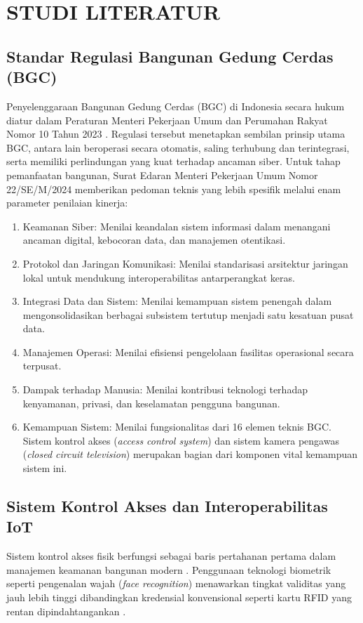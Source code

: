 \cleardoublepage
\chapter{STUDI LITERATUR}
\label{chap:studi-literatur}

\section{Standar Regulasi Bangunan Gedung Cerdas (BGC)}
Penyelenggaraan Bangunan Gedung Cerdas (BGC) di Indonesia secara hukum diatur dalam Peraturan Menteri Pekerjaan Umum dan Perumahan Rakyat Nomor 10 Tahun 2023 \autocite{PermenPUPR_10_2023}. Regulasi tersebut menetapkan sembilan prinsip utama BGC, antara lain beroperasi secara otomatis, saling terhubung dan terintegrasi, serta memiliki perlindungan yang kuat terhadap ancaman siber. Untuk tahap pemanfaatan bangunan, Surat Edaran Menteri Pekerjaan Umum Nomor 22/SE/M/2024 \autocite{pu2024se22} memberikan pedoman teknis yang lebih spesifik melalui enam parameter penilaian kinerja:

\begin{enumerate}
    \item Keamanan Siber: Menilai keandalan sistem informasi dalam menangani ancaman digital, kebocoran data, dan manajemen otentikasi.
    \item Protokol dan Jaringan Komunikasi: Menilai standarisasi arsitektur jaringan lokal untuk mendukung interoperabilitas antarperangkat keras.
    \item Integrasi Data dan Sistem: Menilai kemampuan sistem penengah dalam mengonsolidasikan berbagai subsistem tertutup menjadi satu kesatuan pusat data.
    \item Manajemen Operasi: Menilai efisiensi pengelolaan fasilitas operasional secara terpusat.
    \item Dampak terhadap Manusia: Menilai kontribusi teknologi terhadap kenyamanan, privasi, dan keselamatan pengguna bangunan.
    \item Kemampuan Sistem: Menilai fungsionalitas dari 16 elemen teknis BGC. Sistem kontrol akses (\textit{access control system}) dan sistem kamera pengawas (\textit{closed circuit television}) merupakan bagian dari komponen vital kemampuan sistem ini.
\end{enumerate}

\section{Sistem Kontrol Akses dan Interoperabilitas IoT}
Sistem kontrol akses fisik berfungsi sebagai baris pertahanan pertama dalam manajemen keamanan bangunan modern \autocite{norman2011electronic}. Penggunaan teknologi biometrik seperti pengenalan wajah (\textit{face recognition}) menawarkan tingkat validitas yang jauh lebih tinggi dibandingkan kredensial konvensional seperti kartu RFID yang rentan dipindahtangankan \autocite{wanjare2024}.

